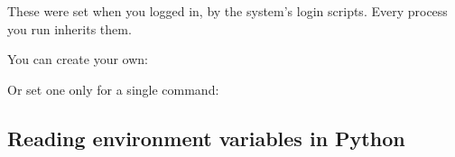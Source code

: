 \noindent{}These were set when you logged in, by the system's login scripts. Every process you run inherits them.

You can create your own:

\begin{codebox}[short]

\begin{Shaded}
\begin{Highlighting}[]
 \OperatorTok{=}
\end{Highlighting}
\end{Shaded}

\end{codebox}

\noindent{}Or set one only for a single command:

\begin{codebox}[short]

\begin{Shaded}
\begin{Highlighting}[]
\OperatorTok{=}
\end{Highlighting}
\end{Shaded}

\end{codebox}

\subsection*{Reading environment variables in Python}\label{06-local-dependencies:reading-environment-variables-in-python}

